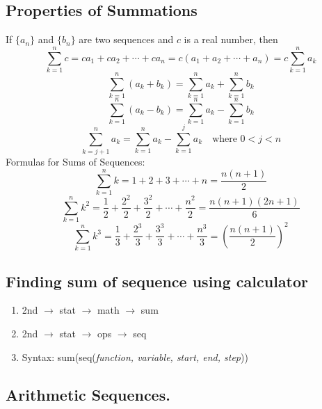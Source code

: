 \documentclass{report}
\begin{document}
    \subsection{Properties of Summations}
    If $\{a_n\}$ and $\{b_n\}$ are two sequences and $c$ is a real number, then
    \[
    \sum_{k=1}^{n} c = c a_1 + c a_2 + \cdots + c a_n = c(a_1 + a_2 + \cdots + a_n) = c \sum_{k=1}^{n} a_k
    \]
    \[
    \sum_{k=1}^{n} (a_k + b_k) = \sum_{k=1}^{n} a_k + \sum_{k=1}^{n} b_k
    \]
    \[
    \sum_{k=1}^{n} (a_k - b_k) = \sum_{k=1}^{n} a_k - \sum_{k=1}^{n} b_k
    \]
    \[
    \sum_{k=j+1}^{n} a_k = \sum_{k=1}^{n} a_k - \sum_{k=1}^{j} a_k \quad \text{where } 0 < j < n
    \]
    Formulas for Sums of Sequences:
    \[
    \sum_{k=1}^{n} k = 1 + 2 + 3 + \cdots + n = \frac{n(n + 1)}{2}
    \]
    \[
    \sum_{k=1}^{n} k^2 = \frac{1}{2} + \frac{2^2}{2} + \frac{3^2}{2} + \cdots + \frac{n^2}{2} = \frac{n(n + 1)(2n + 1)}{6}
    \]
    \[
    \sum_{k=1}^{n} k^3 = \frac{1}{3} + \frac{2^3}{3} + \frac{3^3}{3} + \cdots + \frac{n^3}{3} = \left(\frac{n(n + 1)}{2}\right)^2
    \]

    \bigbreak \noindent \bigbreak \noindent
    \subsection{Finding sum of sequence using calculator}
    \begin{enumerate}
      \item 2nd $\rightarrow$ stat $\rightarrow$ math $\rightarrow$ sum
      \item 2nd $\rightarrow$ stat $\rightarrow$ ops $\rightarrow$ seq
      \item Syntax: sum(seq(\textit{function, variable, start, end, step}))
   \end{enumerate}

   \pagebreak \bigbreak \noindent
   \subsection{
     Arithmetic Sequences.
   }
\end{document}
